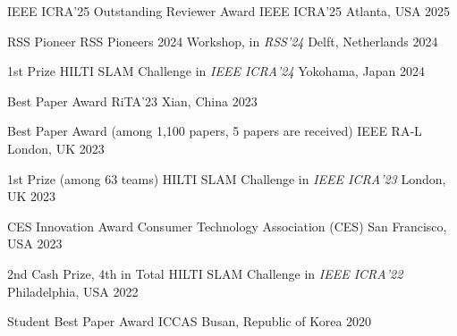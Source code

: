 



\begin{cvhonors}
  \cvhonor
    {IEEE ICRA'25 Outstanding Reviewer Award} %
    {IEEE ICRA'25} %
    {Atlanta, USA} %
    {2025} %

  \cvhonor
    {RSS Pioneer} %
    {RSS Pioneers 2024 Workshop, in \textit{RSS'24}} %
    {Delft, Netherlands} %
    {2024} %

  \cvhonor
    {1st Prize} %
    {HILTI SLAM Challenge in \textit{IEEE ICRA'24}} %
    {Yokohama, Japan} %
    {2024} %

  \cvhonor
    {Best Paper Award} %
    {RiTA'23} %
    {Xian, China} %
    {2023} %

  \cvhonor
    {Best Paper Award (among 1,100 papers, 5 papers are received)} %
    {IEEE RA-L} %
    {London, UK} %
    {2023} %

  \cvhonor
    {1st Prize (among 63 teams)} %
    {HILTI SLAM Challenge in \textit{IEEE ICRA'23}} %
    {London, UK} %
    {2023} %

  \cvhonor
    {CES Innovation Award} %
    {Consumer Technology Association (CES)} %
    {San Francisco, USA} %
    {2023} %

  \cvhonor
    {2nd Cash Prize, 4th in Total} %
    {HILTI SLAM Challenge in \textit{IEEE ICRA'22}} %
    {Philadelphia, USA} %
    {2022} %

  \cvhonor
    {Student Best Paper Award} %
    {ICCAS} %
    {Busan, Republic of Korea} %
    {2020} %

\end{cvhonors}


